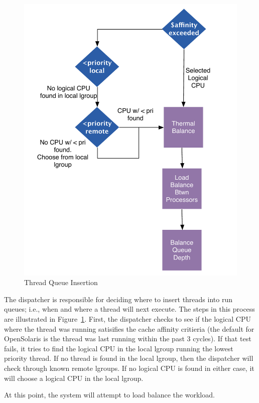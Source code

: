 \documentclass[acmtaco]{acmtrans2m}
\begin{document}
\begin{figure}[htbp]
  \centering
  \includegraphics[scale=0.40]{threadinsert.pdf}
  \caption{Thread Queue Insertion}
  \label{fig:thread}
\end{figure}
The dispatcher is responsible for deciding where to insert threads into
run queues; i.e., when and where a thread will next execute. The steps
in this process are illustrated in Figure~\ref{fig:thread}.  First, the
dispatcher checks to see if the logical CPU where the thread was running
satisifies the cache affinity critieria (the default for OpenSolaris is
the thread was last running within the past 3 cycles).  If that test
fails, it tries to find the logical CPU in the local lgroup running the
lowest priority thread.  If no thread is found in the local lgroup, then
the dispatcher will check through known remote lgroups.  If no logical
CPU is found in either case, it will choose a logical CPU in the local
lgroup.

At this point, the system will attempt to load balance the workload.
\end{document}
